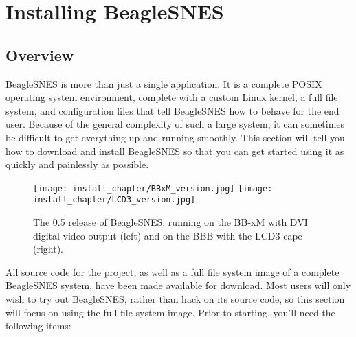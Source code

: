 \chapter{Installing BeagleSNES}

\section{Overview}

BeagleSNES is more than just a single application.  It is a complete POSIX operating system environment, complete with a custom Linux kernel, a full file system, and configuration files that tell BeagleSNES how to behave for the end user.  Because of the general complexity of such a large system, it can sometimes be difficult to get everything up and running smoothly.  This section will tell you how to download and install BeagleSNES so that you can get started using it as quickly and painlessly as possible.  

\begin{figure}[h]
\centering\texttt{[image: install\_chapter/BBxM\_version.jpg]}
\texttt{[image: install\_chapter/LCD3\_version.jpg]}
\caption{The 0.5 release of BeagleSNES, running on the BB-xM with DVI digital video output (left) and on the BBB with the LCD3 cape (right).}
\end{figure}

All source code for the project, as well as a full file system image of a complete BeagleSNES system, have been made available for download.  Most users will only wish to try out BeagleSNES, rather than hack on its source code, so this section will focus on using the full file system image.  Prior to starting, you'll need the following items:

